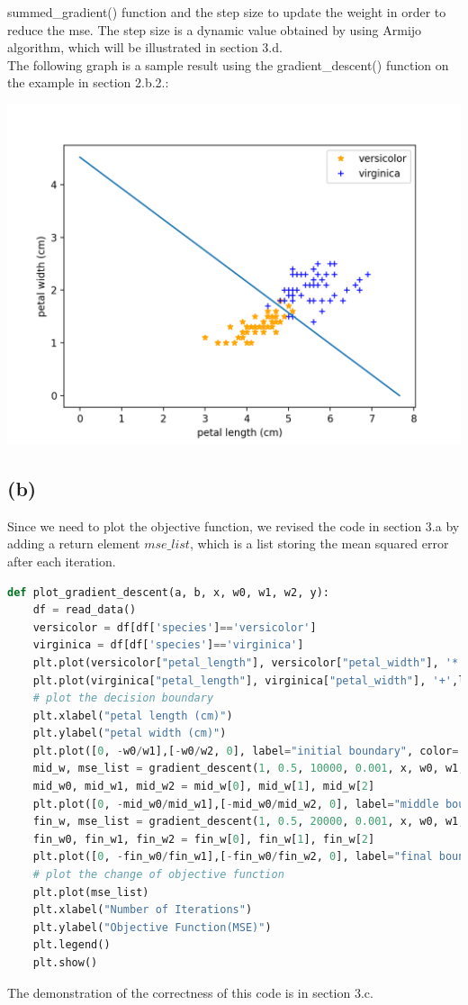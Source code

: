 \documentclass[12pt]{article}
\begin{document}
summed\_gradient() function and the step size to update the weight in order to reduce the mse. The step size is a dynamic value obtained by using 
Armijo algorithm, which will be illustrated in section 3.d. \\
The following graph is a sample result using the gradient\_descent() function on the example in section 2.b.2.:
\begin{center}
    \includegraphics[scale=0.5]{fig/p3a1.png}
\end{center}

\subsection*{(b)}
Since we need to plot the objective function, we revised the code in section 3.a by adding a return element $mse\_list$, which is a list storing the mean 
squared error after each iteration.
\begin{lstlisting}[language=Python, caption=Visualize the Change of Decision Boundary and Objective Function]
def plot_gradient_descent(a, b, x, w0, w1, w2, y):
    df = read_data()
    versicolor = df[df['species']=='versicolor']
    virginica = df[df['species']=='virginica']
    plt.plot(versicolor["petal_length"], versicolor["petal_width"], '*',label="versicolor", color = 'orange')
    plt.plot(virginica["petal_length"], virginica["petal_width"], '+',label="virginica", color = 'blue')
    # plot the decision boundary
    plt.xlabel("petal length (cm)")
    plt.ylabel("petal width (cm)")
    plt.plot([0, -w0/w1],[-w0/w2, 0], label="initial boundary", color='purple')
    mid_w, mse_list = gradient_descent(1, 0.5, 10000, 0.001, x, w0, w1, w2, y)
    mid_w0, mid_w1, mid_w2 = mid_w[0], mid_w[1], mid_w[2]
    plt.plot([0, -mid_w0/mid_w1],[-mid_w0/mid_w2, 0], label="middle boundary", color='skyblue')
    fin_w, mse_list = gradient_descent(1, 0.5, 20000, 0.001, x, w0, w1, w2, y)
    fin_w0, fin_w1, fin_w2 = fin_w[0], fin_w[1], fin_w[2]
    plt.plot([0, -fin_w0/fin_w1],[-fin_w0/fin_w2, 0], label="final boundary", color='olive')
    # plot the change of objective function
    plt.plot(mse_list)
    plt.xlabel("Number of Iterations")
    plt.ylabel("Objective Function(MSE)")    
    plt.legend()
    plt.show()
\end{lstlisting}
The demonstration of the correctness of this code is in section 3.c. 
\end{document}
